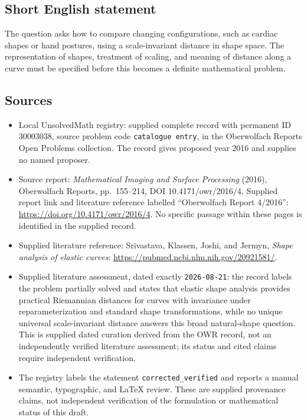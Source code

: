 \documentclass[11pt]{article}
\begin{document}
\subsection{Short English statement}
The question asks how to compare changing configurations, such as cardiac shapes or hand postures, using a scale-invariant distance in shape space. The representation of shapes, treatment of scaling, and meaning of distance along a curve must be specified before this becomes a definite mathematical problem.
\subsection{Sources}
\begin{itemize}
\item Local UnsolvedMath registry: supplied complete record with permanent ID \(30003038\), source problem code \texttt{catalogue entry}, in the Oberwolfach Reports Open Problems collection. The record gives proposed year 2016 and supplies no named proposer.
\item Source report: \emph{Mathematical Imaging and Surface Processing} (2016), Oberwolfach Reports, pp.\ 155--214, DOI 10.4171/owr/2016/4. Supplied report link and literature reference labelled ``Oberwolfach Report 4/2016'': \url{https://doi.org/10.4171/owr/2016/4}. No specific passage within these pages is identified in the supplied record.
\item Supplied literature reference: Srivastava, Klassen, Joshi, and Jermyn, \emph{Shape analysis of elastic curves}: \url{https://pubmed.ncbi.nlm.nih.gov/20921581/}.
\item Supplied literature assessment, dated exactly \texttt{2026-08-21}: the record labels the problem partially solved and states that elastic shape analysis provides practical Riemannian distances for curves with invariance under reparameterization and standard shape transformations, while no unique universal scale-invariant distance answers this broad natural-shape question. This is supplied dated curation derived from the OWR record, not an independently verified literature assessment; its status and cited claims require independent verification.
\item The registry labels the statement \texttt{corrected\_verified} and reports a manual semantic, typographic, and LaTeX review. These are supplied provenance claims, not independent verification of the formulation or mathematical status of this draft.
\end{itemize}
\end{document}
